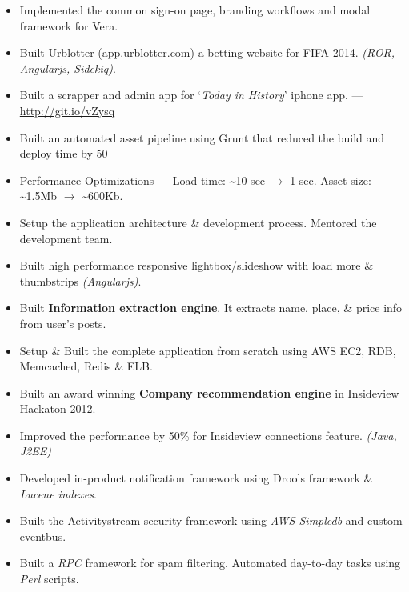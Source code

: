 \documentclass{resume}
\begin{document}

\begin{itemize} \itemsep1pt \parskip0pt
  \item Implemented the common sign-on page, branding workflows and modal framework for Vera.
  \item Built Urblotter (app.urblotter.com) a betting website for FIFA 2014. \textit{(ROR, Angularjs, Sidekiq)}.
  \item Built a scrapper and admin app for `\textit{Today in History}' iphone app. --- \url{http://git.io/vZysq}
\end{itemize}

\begin{itemize} \itemsep1pt \parskip0pt
  \item Built an automated asset pipeline using Grunt that reduced the build and deploy time by 50%
  \item Performance Optimizations --- Load time: \textasciitilde10 sec \( \rightarrow \) 1 sec.  
    Asset size: \textasciitilde1.5Mb \( \rightarrow \) \textasciitilde600Kb.
  \item Setup the application architecture \& development process. Mentored the development team.
  \item Built high performance responsive lightbox/slideshow with load more \& thumbstrips \textit{(Angularjs)}.
\end{itemize}
\begin{itemize} \itemsep1pt \parskip0pt
  \item Built \textbf{Information extraction engine}. It extracts name, place, \& price info from user's posts.
  \item Setup \& Built the complete application from scratch using AWS EC2, RDB, Memcached, Redis \& ELB\@. 
\end{itemize}
\begin{itemize} \itemsep1pt \parskip0pt
  \item Built an award winning \textbf{Company recommendation engine} in Insideview Hackaton 2012.
  \item Improved the performance by 50\% for Insideview connections feature. \textit{(Java, J2EE)}
  \item Developed in-product notification framework using Drools framework \& \textit{Lucene indexes}.
  \item Built the Activitystream security framework using \textit{AWS Simpledb} and custom eventbus.
\end{itemize}
\begin{itemize} \itemsep1pt \parskip0pt
  \item Built a \textit{RPC} framework for spam filtering.  Automated day-to-day tasks using \textit{Perl} scripts.
\end{itemize}
\end{document}
